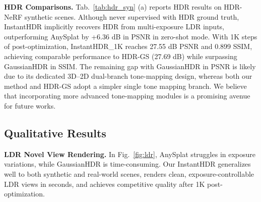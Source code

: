 \documentclass[runningheads]{llncs}
\begin{document}



\noindent\textbf{HDR Comparisons.}
Tab.~\ref{tab:hdr_syn} (a) reports HDR results on HDR-NeRF synthetic scenes.
Although never supervised with HDR ground truth, InstantHDR implicitly recovers HDR from multi-exposure LDR inputs, outperforming AnySplat by +6.36 dB in PSNR in zero-shot mode.
With 1K steps of post-optimization, InstantHDR\_1K reaches 27.55 dB PSNR and 0.899 SSIM, achieving comparable performance to HDR-GS (27.69 dB) while surpassing GaussianHDR in SSIM.
The remaining gap with GaussianHDR in PSNR is likely due to its dedicated 3D--2D dual-branch tone-mapping design, whereas both our method and HDR-GS adopt a simpler single tone mapping branch.
We believe that incorporating more advanced tone-mapping modules is a promising avenue for future works.


\subsection{Qualitative Results}
\noindent\textbf{LDR Novel View Rendering.}
In Fig.~\ref{fig:ldr}, AnySplat struggles in exposure variations, while GaussianHDR is time-consuming. 
Our InstantHDR generalizes well to both synthetic and real-world scenes, renders clean, exposure-controllable LDR views in seconds, and achieves competitive quality after 1K post-optimization.
\end{document}
